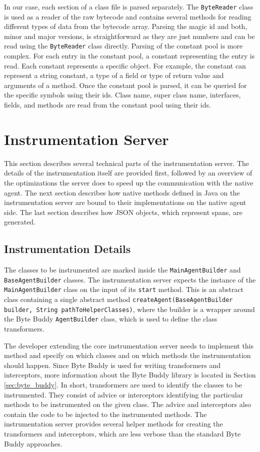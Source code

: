 In our case, each section of a class file is parsed separately. The \texttt{ByteReader} class is used as a reader of the raw bytecode and contains several methods for reading different types of data from the bytecode array. Parsing the magic id and both, minor and major versions, is straightforward as they are just numbers and can be read using the \texttt{ByteReader} class directly. Parsing of the constant pool is more complex. For each entry in the constant pool, a constant representing the entry is read. Each constant represents a specific object. For example, the constant can represent a string constant, a type of a field or type of return value and arguments of a method. Once the constant pool is parsed, it can be queried for the specific symbols using their ids. Class name, super class name, interfaces, fields, and methods are read from the constant pool using their ids.

\section{Instrumentation Server}
This section describes several technical parts of the instrumentation server. The details of the instrumentation itself are provided first, followed by an overview of the optimizations the server does to speed up the communication with the native agent. The next section describes how native methods defined in Java on the instrumentation server are bound to their implementations on the native agent side. The last section describes how JSON objects, which represent spans, are generated.

\subsection{Instrumentation Details}
\label{impl:server:instr}
The classes to be instrumented are marked inside the \texttt{MainAgentBuilder} and \texttt{BaseAgentBuilder} classes. The instrumentation server expects the instance of the \texttt{MainAgentBuilder} class on the input of its \texttt{start} method. This is an abstract class containing a single abstract method \texttt{createAgent(BaseAgentBuilder \linebreak builder, String pathToHelperClasses)}, where the builder is a wrapper \linebreak around the Byte Buddy \texttt{AgentBuilder} class, which is used to define the class transformers.

The developer extending the core instrumentation server needs to implement this method and specify on which classes and on which methods the instrumentation should happen. Since Byte Buddy is used for writing transformers and interceptors, more information about the Byte Buddy library is located in Section \ref{sec:byte_buddy}. In short, transformers are used to identify the classes to be instrumented. They consist of advice or interceptors identifying the particular methods to be instrumented on the given class. The advice and interceptors also contain the code to be injected to the instrumented methods. The instrumentation server provides several helper methods for creating the transformers and interceptors, which are less verbose than the standard Byte Buddy approaches.

